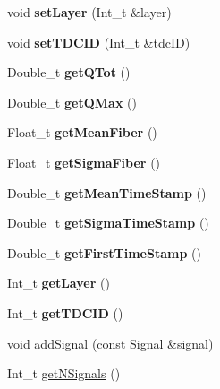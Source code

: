 \begin{DoxyCompactItemize}
void {\bfseries set\+Layer} (Int\+\_\+t \&layer)
\item 
\mbox{\label{classCluster_a69ecb0377864d4c9229c3dd9ab7576d0}} 
void {\bfseries set\+T\+D\+C\+ID} (Int\+\_\+t \&tdc\+ID)
\item 
\mbox{\label{classCluster_a480632337fcaf7629f8ba2490819cc9a}} 
Double\+\_\+t {\bfseries get\+Q\+Tot} ()
\item 
\mbox{\label{classCluster_a1c5bc215c52e4bad5409fc09a8ca5865}} 
Double\+\_\+t {\bfseries get\+Q\+Max} ()
\item 
\mbox{\label{classCluster_afeea4a9ed002eea5f7b4d315adc2c537}} 
Float\+\_\+t {\bfseries get\+Mean\+Fiber} ()
\item 
\mbox{\label{classCluster_aff40b7e0a9ca61d13b4914b93545eec2}} 
Float\+\_\+t {\bfseries get\+Sigma\+Fiber} ()
\item 
\mbox{\label{classCluster_adbaa8320c05b9d1eeb5045becac00697}} 
Double\+\_\+t {\bfseries get\+Mean\+Time\+Stamp} ()
\item 
\mbox{\label{classCluster_a0939ece440966900a066bbb950c09362}} 
Double\+\_\+t {\bfseries get\+Sigma\+Time\+Stamp} ()
\item 
\mbox{\label{classCluster_a4c4d763ac24966aaac2bfb4591eb774e}} 
Double\+\_\+t {\bfseries get\+First\+Time\+Stamp} ()
\item 
\mbox{\label{classCluster_af3d84b8a21a41f49ff292698eb0029d9}} 
Int\+\_\+t {\bfseries get\+Layer} ()
\item 
\mbox{\label{classCluster_ae38ce6e3bd38f4d8fd0c438be15640aa}} 
Int\+\_\+t {\bfseries get\+T\+D\+C\+ID} ()
\item 
void \hyperlink{classCluster_aa12f4e548b102a48621ca7ec91bc2330}{add\+Signal} (const \hyperlink{classSignal}{Signal} \&signal)
\item 
\mbox{\label{classCluster_af2a12e41d81b74a04aa88c691b4c5c5b}} 
Int\+\_\+t \hyperlink{classCluster_af2a12e41d81b74a04aa88c691b4c5c5b}{get\+N\+Signals} ()

\end{DoxyCompactItemize}
